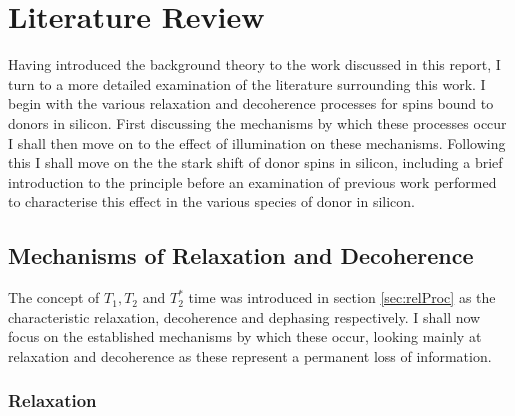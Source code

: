 
\chapter{Literature Review}
\label{chap:litRev}

Having introduced the background theory to the work discussed in this report, I turn to a more detailed examination of the literature surrounding this work.
I begin with the various relaxation and decoherence processes for spins bound to donors in silicon.
First discussing the mechanisms by which these processes occur I shall then move on to the effect of illumination on these mechanisms.
Following this I shall move on the the stark shift of donor spins in silicon, including a brief introduction to the principle before an examination of previous work performed to characterise this effect in the various species of donor in silicon.


\section{Mechanisms of Relaxation and Decoherence}
\label{sec:mechrelax}
The concept of $T_1, T_2$ and $T_2^*$ time was introduced in section \ref{sec:relProc} as the characteristic relaxation, decoherence and dephasing respectively. 
I shall now focus on the established mechanisms by which these occur, looking mainly at relaxation and decoherence as these represent a permanent loss of information.

\subsection{Relaxation}

